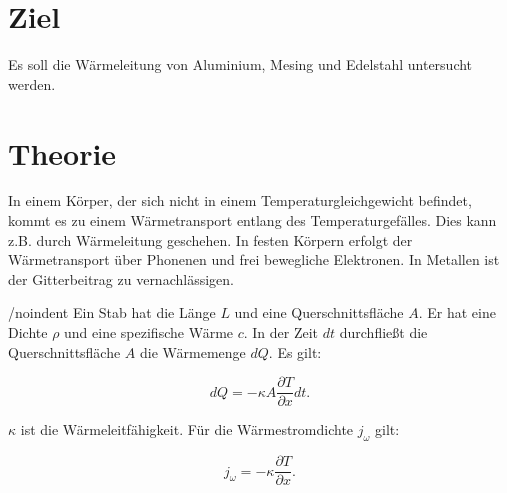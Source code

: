 \section{Ziel}
\label{sec:Ziel}

Es soll die Wärmeleitung von Aluminium, Mesing und Edelstahl untersucht werden. 

\section{Theorie}
\label{sec:Theorie}

In einem Körper, der sich nicht in einem Temperaturgleichgewicht befindet, kommt es zu einem Wärmetransport entlang des Temperaturgefälles. Dies kann z.B. durch Wärmeleitung geschehen. In festen Körpern erfolgt der Wärmetransport über Phonenen und frei bewegliche Elektronen. In Metallen ist der Gitterbeitrag zu vernachlässigen. 

/noindent Ein Stab hat die Länge $L$ und eine Querschnittsfläche $A$. Er hat eine Dichte $\rho$ und eine spezifische Wärme $c$.
In der Zeit $dt$ durchfließt die Querschnittsfläche $A$ die Wärmemenge $dQ$. Es gilt:

\begin{equation}
dQ = -\kappa A \frac{\partial T}{\partial x} dt.
\label{eq:dQ}
\end{equation}

$\kappa$ ist die Wärmeleitfähigkeit. Für die Wärmestromdichte $j_\omega$ gilt:

\begin{equation}
    j_{\omega} = -\kappa \frac{\partial T}{\partial x}.
    \label{eq:jomega}
\end{equation}


